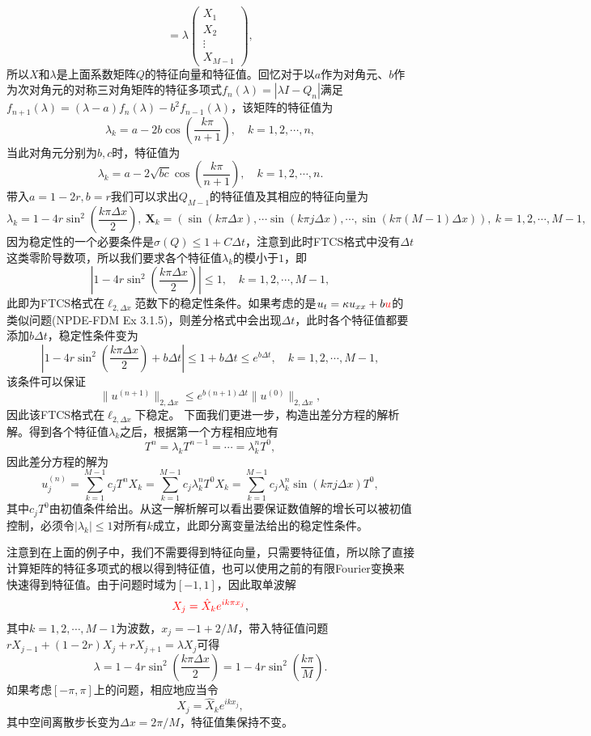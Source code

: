 \documentclass[a4paper,10pt]{ctexart}
\begin{document}
\begin{example}
\[        = \lambda
        \begin{pmatrix}
            X_1\\
            X_2\\
            \vdots\\
            X_{M-1}
        \end{pmatrix},
    \]
    所以$ X $和$ \lambda $是上面系数矩阵$ Q $的特征向量和特征值。回忆对于以$ a $作为对角元、$ b $作为次对角元的对称三对角矩阵的特征多项式$ f_n(\lambda) = |\lambda I -Q_n| $满足$ f_{n+1}(\lambda) = (\lambda-a)f_n(\lambda)-b^2f_{n-1}(\lambda) $，该矩阵的特征值为
    \[
        \lambda_k = a-2b\cos\left( \frac{k\pi}{n+1} \right) ,\quad k=1,2,\cdots ,n,
    \]
    当此对角元分别为$ b,c $时，特征值为
    \[
        \lambda_k = a-2\sqrt{bc} \cos\left( \frac{k\pi}{n+1} \right) ,\quad k=1,2,\cdots ,n.  
    \]
    带入$ a=1-2r,b=r $我们可以求出$ Q_{M-1} $的特征值及其相应的特征向量为
    \[
        \lambda_k = 1-4r\sin^2\left( \frac{k \pi \Delta x}{2} \right),\ \bm{X}_k = (\sin(k\pi\Delta x),\cdots \sin(k\pi j\Delta x),\cdots ,\sin(k\pi(M-1)\Delta x)),\ k=1,2,\cdots ,M-1,
    \]
    因为稳定性的一个必要条件是$ \sigma(Q)\leqslant 1+C\Delta t $，注意到此时FTCS格式中没有$ \Delta t $这类零阶导数项，所以我们要求各个特征值$ \lambda_k $的模小于$ 1 $，即
    \[
        |1-4r\sin^2\left( \frac{k \pi \Delta x}{2} \right)| \leqslant 1,\quad k=1,2,\cdots ,M-1,  
    \]
    此即为FTCS格式在$ \ell_{2,\Delta x} $范数下的稳定性条件。如果考虑的是$ u_t = \kappa u_{xx}+b\textcolor{red}{u} $的类似问题(NPDE-FDM Ex 3.1.5)，则差分格式中会出现$ \Delta t $，此时各个特征值都要添加$ b \Delta t $，稳定性条件变为
    \[
        |1-4r\sin^2\left( \frac{k \pi \Delta x}{2} \right)+b\Delta t| \leqslant 1+b\Delta t\leqslant e^{b \Delta t},\quad k=1,2,\cdots ,M-1,
    \]
    该条件可以保证
    \[
        \| u^{(n+1)} \|_{2,\Delta x}\leqslant e^{b (n+1)\Delta t}\| u^{(0)} \|_{2,\Delta x},
    \]
    因此该FTCS格式在$ \ell_{2,\Delta x} $下稳定。
    下面我们更进一步，构造出差分方程的解析解。得到各个特征值$ \lambda_k $之后，根据第一个方程相应地有
    \[
        T^n = \lambda_k T^{n-1} = \cdots = \lambda_k^n T^0,
    \]
    因此差分方程的解为
    \begin{equation}
        u^{(n)}_j = \sum_{k=1}^{M-1} c_j T^n X_k = \sum_{k=1}^{M-1} c_j \lambda_k^n T^0 X_k = \sum_{k=1}^{M-1} c_j \lambda_k^n \sin(k\pi j\Delta x)T^0,
    \end{equation}
    其中$ c_jT^0 $由初值条件给出。从这一解析解可以看出要保证数值解的增长可以被初值控制，必须令$ |\lambda_k|\leqslant 1 $对所有$ k $成立，此即分离变量法给出的稳定性条件。
\end{example}
注意到在上面的例子中，我们不需要得到特征向量，只需要特征值，所以除了直接计算矩阵的特征多项式的根以得到特征值，也可以使用之前的有限Fourier变换来快速得到特征值。由于问题时域为$ [-1,1] $，因此取单波解
\[
    \textcolor{red}{X_j = \hat{X}_k e^{ik\pi x_j}},
\]
其中$ k = 1,2,\cdots ,M-1 $为波数，$ x_j = -1+2 / M $，带入特征值问题$ rX_{j-1}+(1-2r)X_j+rX_{j+1} = \lambda X_j $可得
\[
    \lambda = 1-4r\sin^2\left( \frac{k \pi \Delta x}{2} \right) = 1-4r\sin^2\left( \frac{k \pi}{M} \right).
\]
如果考虑$ [-\pi,\pi] $上的问题，相应地应当令
\[
    X_j = \hat{X}_k e^{ik x_j},
\]
其中空间离散步长变为$ \Delta x = 2\pi / M $，特征值集保持不变。
\end{document}
